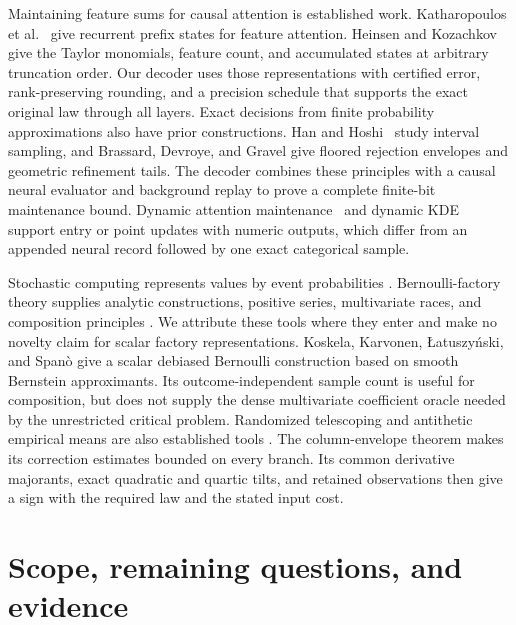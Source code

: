 Maintaining feature sums for causal attention is established work.
Katharopoulos et al.~\cite{katharopoulos2020linear} give recurrent
prefix states for feature attention. Heinsen and
Kozachkov~\cite{heinsen2026taylor} give the Taylor monomials,
feature count, and accumulated states at arbitrary truncation
order. Our decoder uses those representations with certified
error, rank-preserving rounding, and a precision schedule that
supports the exact original law through all layers.
Exact decisions from finite probability approximations also have
prior constructions. Han and Hoshi~\cite{han1997interval} study interval sampling, and
Brassard, Devroye, and Gravel \cite{brassard2019remote} give floored
rejection envelopes and geometric refinement tails. The decoder
combines these principles with a causal neural evaluator and
background replay to prove a complete finite-bit maintenance bound.
Dynamic attention maintenance~\cite{vandenbrand2024dynamic} and
dynamic KDE~\cite{liang2025dynamic} support entry or point updates
with numeric outputs, which differ from an appended neural record
followed by one exact categorical sample.

Stochastic computing represents values by event probabilities
\cite{gaines1967,gaines1969,browncard2001}. Bernoulli-factory theory
supplies analytic constructions, positive series, multivariate
races, and composition principles
\cite{nacuperes2005,holtz2011,mendo2019,dughmi2017,morina2022}.
We attribute these tools where they enter and make no novelty claim
for scalar factory representations. Koskela, Karvonen,
{\L}atuszy{\'n}ski, and Span{\`o} \cite{koskela2026debiased} give a
scalar debiased Bernoulli construction based on smooth Bernstein
approximants. Its outcome-independent sample count is useful for
composition, but does not supply the dense multivariate coefficient
oracle needed by the unrestricted critical problem. Randomized
telescoping and antithetic empirical means are also established
tools \cite{rheeglynn2015,blanchetglynn2015,blanchetchenglynn2015}.
The column-envelope theorem makes its correction estimates bounded on
every branch. Its common derivative majorants, exact quadratic and
quartic tilts, and retained observations then give a sign with the
required law and the stated input cost.

\section{Scope, remaining questions, and evidence}
\label{sec:status}

